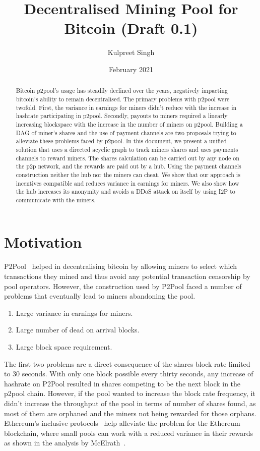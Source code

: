 \documentclass{article}
\title{Decentralised Mining Pool for Bitcoin (Draft 0.1)}
\author{Kulpreet Singh}
\date{February 2021}
\begin{document}
\maketitle

\begin{abstract}
  Bitcoin p2pool's usage has steadily declined over the years,
  negatively impacting bitcoin's ability to remain decentralised. The
  primary problems with p2pool were twofold. First, the variance in
  earnings for miners didn't reduce with the increase in hashrate
  participating in p2pool. Secondly, payouts to miners required a
  linearly increasing blockspace with the increase in the number of
  miners on p2pool. Building a DAG of miner's shares and the use of
  payment channels are two proposals trying to alleviate these
  problems faced by p2pool. In this document, we present a unified
  solution that uses a directed acyclic graph to track miners shares
  and uses payments channels to reward miners. The shares calculation
  can be carried out by any node on the p2p network, and the rewards
  are paid out by a hub. Using the payment channels construction
  neither the hub nor the miners can cheat. We show that our approach
  is incentives compatible and reduces variance in earnings for
  miners. We also show how the hub increases its anonymity and avoids
  a DDoS attack on itself by using I2P to communicate with the miners.
\end{abstract}
   
\section{Motivation}

P2Pool~\cite{p2pool:wiki} helped in decentralising bitcoin by allowing
miners to select which transactions they mined and thus avoid any
potential transaction censorship by pool operators. However, the
construction used by P2Pool faced a number of problems that eventually
lead to miners abandoning the pool.

\begin{enumerate}
\item Large variance in earnings for miners.
\item Large number of dead on arrival blocks.
\item Large block space requirement.
\end{enumerate}

The first two problems are a direct consequence of the shares block
rate limited to 30 seconds. With only one block possible every thirty
seconds, any increase of hashrate on P2Pool resulted in shares
competing to be the next block in the p2pool chain. However, if the
pool wanted to increase the block rate frequency, it didn't increase
the throughput of the pool in terms of number of shares found, as most
of them are orphaned and the miners not being rewarded for those
orphans. Ethereum's inclusive protocols~\cite{inclusive-protocols}
help alleviate the problem for the Ethereum blockchain, where small
pools can work with a reduced variance in their rewards as shown in
the analysis by McElrath~\cite{mcelrath:variance}.
\end{document}
